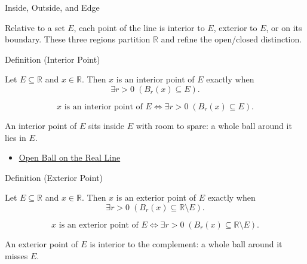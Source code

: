 \label{sec:interior-exterior-boundary}

\begin{topicbox}{Inside, Outside, and Edge}
\begin{exposition}
Relative to a set $E$, each point of the line is interior to $E$, exterior to $E$, or on its boundary. These three regions partition $\mathbb{R}$ and refine the open/closed distinction.
\end{exposition}
\end{topicbox}
\begin{definitionbox}{Definition (Interior Point)}
\begin{definition}
\label{def:interior-point}
Let $E\subseteq\mathbb{R}$ and $x\in\mathbb{R}$. Then $x$ is an interior point of $E$ exactly when
\[
\exists r>0\;(B_{r}(x)\subseteq E).
\]
\end{definition}
\end{definitionbox}
\begin{remark*}
\[
x \text{ is an interior point of } E \Longleftrightarrow \exists r>0\;(B_{r}(x)\subseteq E).
\]
\end{remark*}
\begin{remark*}[Interpretation]
An interior point of $E$ sits inside $E$ with room to spare: a whole ball around it lies in $E$.
\end{remark*}
\begin{dependencies}
\begin{itemize}
  \item \hyperref[def:open-ball]{Open Ball on the Real Line}
\end{itemize}
\end{dependencies}
\begin{definitionbox}{Definition (Exterior Point)}
\begin{definition}
\label{def:exterior-point}
Let $E\subseteq\mathbb{R}$ and $x\in\mathbb{R}$. Then $x$ is an exterior point of $E$ exactly when
\[
\exists r>0\;(B_{r}(x)\subseteq \mathbb{R}\setminus E).
\]
\end{definition}
\end{definitionbox}
\begin{remark*}
\[
x \text{ is an exterior point of } E \Longleftrightarrow \exists r>0\;(B_{r}(x)\subseteq \mathbb{R}\setminus E).
\]
\end{remark*}
\begin{remark*}[Interpretation]
An exterior point of $E$ is interior to the complement: a whole ball around it misses $E$.
\end{remark*}
